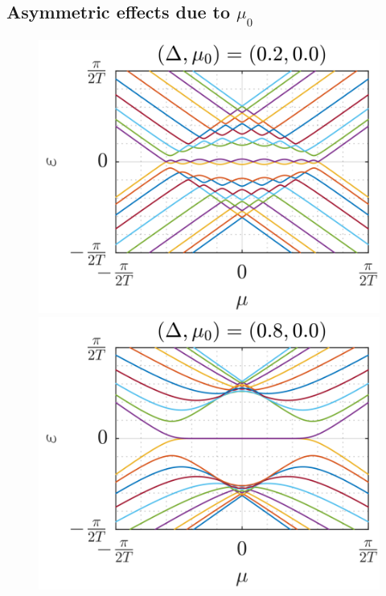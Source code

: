 \documentclass[11pt]{report}
\begin{document}
\subsection*{Asymmetric effects due to $\mu_0$}
\begin{figure}
\centering
\includegraphics[scale=1]{Figures/New/Quasienergies_Exact1.png}%
\includegraphics[scale=1]{Figures/New/Quasienergies_Exact2.png}\\

\end{figure}
\end{document}

